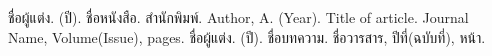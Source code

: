 \begin{thebibliography}{99}
	 ชื่อผู้แต่ง. (ปี). ชื่อหนังสือ. สำนักพิมพ์.
	 Author, A. (Year). Title of article. Journal Name, Volume(Issue), pages.
	 ชื่อผู้แต่ง. (ปี). ชื่อบทความ. ชื่อวารสาร, ปีที่(ฉบับที่), หน้า.
\end{thebibliography}

% 